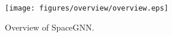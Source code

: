 \begin{figure}[t]
\centering

\vspace{-5mm}
\texttt{[image: figures/overview/overview.eps]}

\caption{Overview of SpaceGNN.}
\label{fig:ovewview}
\vspace{-5mm}
\end{figure}